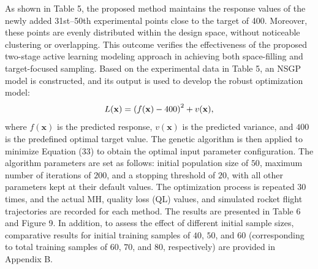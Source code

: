 \documentclass[]{interact}
\theoremstyle{plain}%
\theoremstyle{definition}
\theoremstyle{remark}
\begin{document}
As shown in Table 5, the proposed method maintains the response values of the newly added 31st–50th experimental points close to the target of 400. Moreover, these points are evenly distributed within the design space, without noticeable clustering or overlapping. This outcome verifies the effectiveness of the proposed two-stage active learning modeling approach in achieving both space-filling and target-focused sampling. Based on the experimental data in Table 5, an NSGP model is constructed, and its output is used to develop the robust optimization model:
\begin{equation}
	L({\bf{x}}) = {\left( {f({\bf{x}}) - 400} \right)^2} + v({\bf{x}}),
\end{equation}
where $f(\mathbf{x})$ is the predicted response, $v(\mathbf{x})$ is the predicted variance, and $400$ is the predefined optimal target value. The genetic algorithm is then applied to minimize Equation (33) to obtain the optimal input parameter configuration. The algorithm parameters are set as follows: initial population size of $50$, maximum number of iterations of $200$, and a stopping threshold of $20$, with all other parameters kept at their default values. The optimization process is repeated $30$ times, and the actual MH, quality loss (QL) values, and simulated rocket flight trajectories are recorded for each method. The results are presented in Table 6 and Figure 9. In addition, to assess the effect of different initial sample sizes, comparative results for initial training samples of $40$, $50$, and $60$ (corresponding to total training samples of $60$, $70$, and $80$, respectively) are provided in Appendix B. 
\end{document}
